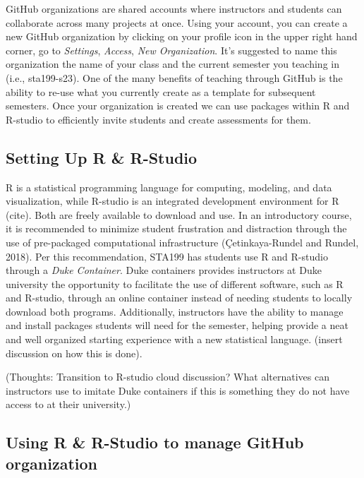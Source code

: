 \documentclass[
  12pt]{article}
\begin{document}
GitHub organizations are shared accounts where instructors and students
can collaborate across many projects at once. Using your account, you
can create a new GitHub organization by clicking on your profile icon in
the upper right hand corner, go to \emph{Settings}, \emph{Access},
\emph{New Organization}. It's suggested to name this organization the
name of your class and the current semester you teaching in (i.e.,
sta199-s23). One of the many benefits of teaching through GitHub is the
ability to re-use what you currently create as a template for subsequent
semesters. Once your organization is created we can use packages within
R and R-studio to efficiently invite students and create assessments for
them.

\hypertarget{setting-up-r-r-studio}{%
\subsection{Setting Up R \& R-Studio}\label{setting-up-r-r-studio}}

R is a statistical programming language for computing, modeling, and
data visualization, while R-studio is an integrated development
environment for R (cite). Both are freely available to download and use.
In an introductory course, it is recommended to minimize student
frustration and distraction through the use of pre-packaged
computational infrastructure (Çetinkaya-Rundel and Rundel, 2018). Per
this recommendation, STA199 has students use R and R-studio through a
\emph{Duke Container}. Duke containers provides instructors at Duke
university the opportunity to facilitate the use of different software,
such as R and R-studio, through an online container instead of needing
students to locally download both programs. Additionally, instructors
have the ability to manage and install packages students will need for
the semester, helping provide a neat and well organized starting
experience with a new statistical language. (insert discussion on how
this is done).

(Thoughts: Transition to R-studio cloud discussion? What alternatives
can instructors use to imitate Duke containers if this is something they
do not have access to at their university.)

\hypertarget{using-r-r-studio-to-manage-github-organization}{%
\subsection{Using R \& R-Studio to manage GitHub
organization}\label{using-r-r-studio-to-manage-github-organization}}
\end{document}
